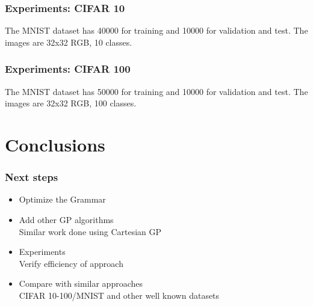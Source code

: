 \documentclass[aspectratio=169]{beamer}
\begin{document}
		\begin{frame}
			\frametitle{Experiments: CIFAR 10}
			
			The MNIST dataset has 40000 for training and 10000 for validation and test. The images are 32x32 RGB, 10 classes.
		
		\end{frame}
		\begin{frame}
			\frametitle{Experiments: CIFAR 100}
			
			The MNIST dataset has 50000 for training and 10000 for validation and test. The images are 32x32 RGB, 100 classes.
		
		\end{frame}
	\section{Conclusions}
		\begin{frame}
			\frametitle{Next steps}
			
			\begin{itemize}
				\item Optimize the Grammar

				\item Add other GP algorithms\\
					\textcolor{ExecusharesGrey}{\small\hspace{1em}Similar work done using Cartesian GP}

				\item Experiments\\
					\textcolor{ExecusharesGrey}{\small\hspace{1em}Verify efficiency of approach}

				\item Compare with similar approaches\\
					\textcolor{ExecusharesGrey}{\small\hspace{1em}CIFAR 10-100/MNIST and other well known datasets}

			\end{itemize}
		\end{frame}
		\frame{\acknowledgmentpage}
\end{document}
